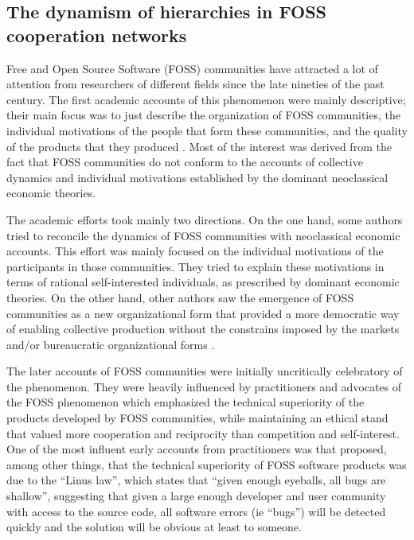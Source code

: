 \subsection{The dynamism of hierarchies in FOSS cooperation networks}

Free and Open Source Software (FOSS) communities have attracted a lot of attention from researchers of different fields since the late nineties of the past century. The first academic accounts of this phenomenon were mainly descriptive; their main focus was to just describe the organization of FOSS communities, the individual motivations of the people that form these communities, and the quality of the products that they produced \citep{benkler:2014}. Most of the interest was derived from the fact that FOSS communities do not conform to the accounts of collective dynamics and individual motivations established by the dominant neoclassical economic theories.

The academic efforts took mainly two directions. On the one hand, some authors tried to reconcile the dynamics of FOSS communities with neoclassical economic accounts. This effort was mainly focused on the individual motivations of the participants in those communities. They tried to explain these motivations in terms of rational self-interested individuals, as prescribed by dominant economic theories. On the other hand, other authors saw the emergence of FOSS communities as a new organizational form that provided a more democratic way of enabling collective production without the constrains imposed by the markets and/or bureaucratic organizational forms \citep{benkler:2002, benkler:2006, castells:2013}.

The later accounts of FOSS communities were initially uncritically celebratory of the phenomenon. They were heavily influenced by practitioners and advocates of the FOSS phenomenon which emphasized the technical superiority of the products developed by FOSS communities, while maintaining an ethical stand that valued more cooperation and reciprocity than competition and self-interest. One of the most influent early accounts from practitioners was \citet{raymond:1999} that proposed, among other things, that the technical superiority of FOSS software products was due to the ``Linus law'', which states that ``given enough eyeballs, all bugs are shallow'', suggesting that given a large enough developer and user community with access to the source code, all software errors (ie ``bugs'') will be detected quickly and the solution will be obvious at least to someone.

